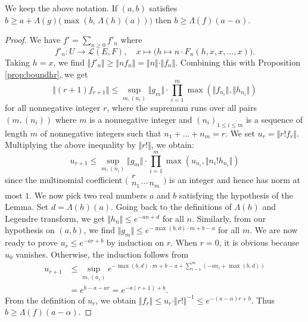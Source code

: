 \documentclass{sig-alternate}
\newcommand{\Z}{\mathbb Z}
\renewcommand{\O}{\mathcal O}
\newcommand{\id}{\textrm{id}}
\def\binom#1#2{\Big(\begin{array}{cc} #1 \\ #2 \end{array}\Big)}
\begin{document}
\begin{lem}
\label{lem:boundLambdaf}
We keep the above notation. 
If $(a,b)$ satisfies
$b \geq a + \Lambda(g)\big( \! \max(b, \, \Lambda(h) (a)) \big)$
then $b \geq \Lambda(f)(a - \alpha)$.
\end{lem}

\begin{proof}
We have $f' = \sum_{n \geq 0} f'_n$ where
$$f'_n : U \to \mathcal L(E,F), \quad
x \mapsto \big(h \mapsto n \cdot F_n(h, x, x, \ldots, x)\big).$$
Taking $h = x$, we find
$\Vert f'_n \Vert \geq \Vert n f_n \Vert = 
\Vert n \Vert \cdot \Vert f_n \Vert$.
Combining this with Proposition \ref{prop:boundhr}, we get
$$\Vert (r+1) f_{r+1} \Vert \leq
  \sup_{m, (n_i)} \Vert g_m \Vert \cdot 
  \prod_{i=1}^m \max(\Vert f_{n_i} \Vert, \Vert h_{n_i} \Vert)$$
for all nonnegative integer $r$,
where the supremum runs over all pairs $(m, (n_i))$ where $m$
is a nonnegative integer and $(n_i)_{1 \leq i \leq m}$ is a sequence of
length $m$ of nonnegative integers such that $n_1 + \ldots + n_m = r$.
We set $u_r = \Vert r! f_r \Vert$. Multiplying the above inequality by
$\Vert r! \Vert$, we obtain:
\begin{equation}
\label{eq:boundurrec}
u_{r+1} \leq
  \sup_{m, (n_i)} \Vert g_m \Vert \cdot 
  \prod_{i=1}^m \max(u_{n_i}, \Vert n_i! h_{n_i} \Vert)
\end{equation}
since the multinomial coefficient $\binom r {\!n_1 \, \cdots \, n_m\!}$
is an integer and hence has norm at most $1$.
We now pick two real numbers $a$ and $b$ satisfying the hypothesis of 
the Lemma. Set $d = \Lambda(h)(a)$. Going back to the definitions of 
$\Lambda (h)$ and Legendre transform, we get $\Vert h_n \Vert \leq e^{- 
a n + d}$ for all $n$.
Similarly, from our hypothesis on $(a,b)$, we find
$\Vert g_m \Vert \leq e^{-\!\max(b,d)\cdot m + b - a}$ for all $m$.
We are now ready to prove $u_r \leq e^{-ar + b}$ by induction on $r$.
When $r = 0$, it is obvious because $u_0$ vanishes. Otherwise, the
induction follows from
\begin{align*}
u_{r+1} 
& \leq \sup_{m, (n_i)}
    e^{ -\max(b,d)\cdot m + b - a + \sum_{i=1}^m (-a n_i + \max(b,d))} \\
& = e^{ b - a - a r } = e^{ -a (r+1) + b}.
\end{align*}
From the definition of $u_r$, we obtain 
$\Vert f_r \Vert \leq u_r \cdot \Vert r! \Vert^{-1} \leq e^{-(a - \alpha) 
r + b}$. Thus $b \geq \Lambda(f)(a - \alpha)$.
\end{proof}

\end{document}
